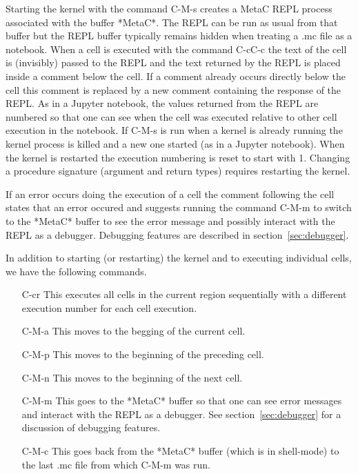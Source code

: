 \documentclass{article}
\begin{document}
Starting the kernel with the command C-M-s creates a MetaC REPL process associated with the buffer *MetaC*.  The REPL can be run as usual from that buffer
but the REPL buffer typically remains hidden when treating a .mc file as a notebook.  When a cell is executed with the command C-cC-c the text of the cell is (invisibly) passed to the REPL
and the text returned by the REPL is placed inside a comment below the cell.  If a comment already occurs directly below the cell this comment is replaced by a new comment containing the
response of the REPL.  As in a Jupyter notebook, the values returned from the REPL are numbered so that one can see when the cell was executed relative to other cell execution in the notebook.
If C-M-s is run when a kernel is already running the kernel process is killed and a new one started (as in a Jupyter notebook).  When the kernel is restarted
the execution numbering is reset to start with 1.  Changing a procedure signature (argument and return types) requires restarting the kernel.

If an error occurs doing the execution of a cell the comment following the cell states that an error occured and suggests running the command C-M-m to switch to the *MetaC* buffer
to see the error message and possibly interact with the REPL as a debugger.  Debugging features are described in section~\ref{sec:debugger}.

In addition to starting (or restarting) the kernel and to executing individual cells, we have the following commands.

\begin{itemize}
\item[C-cr] This executes all cells in the current region sequentially with a different execution number for each cell execution.

\item[C-M-a] This moves to the begging of the current cell.

\item[C-M-p] This moves to the beginning of the preceding cell.

\item[C-M-n] This moves to the beginning of the next cell.

\item[C-M-m] This goes to the *MetaC* buffer so that one can see error messages and interact with the REPL as a debugger.  See section~\ref{sec:debugger} for a discussion of debugging features.

\item[C-M-c] This goes back from the *MetaC* buffer (which is in shell-mode) to the last .mc file from which C-M-m was run.
\end{itemize}
\end{document}
